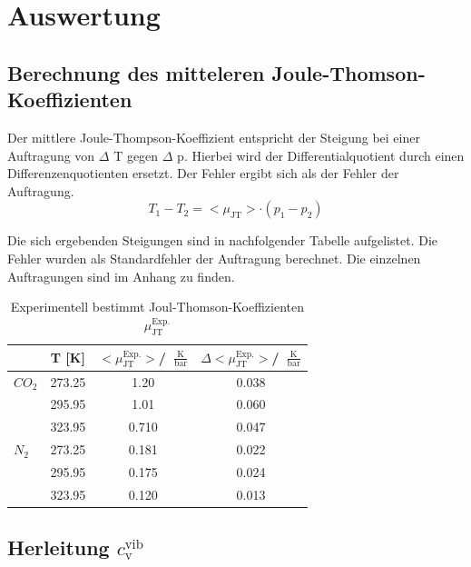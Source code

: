 \documentclass[a4paper,12pt,oneside,onecolum,final,openany]{report}
\begin{document}
\chapter{Auswertung}



\section{Berechnung des mitteleren Joule-Thomson-Koeffizienten}
Der mittlere Joule-Thompson-Koeffizient entspricht der Steigung bei einer Auftragung von $\Delta$ T gegen $\Delta$ p. Hierbei wird der Differentialquotient durch einen Differenzenquotienten ersetzt. Der Fehler ergibt sich als der Fehler der Auftragung.\\

\begin{equation}
T_1 - T_2 = <\mu_{\text{JT}}> \cdot (p_1 - p_2)
\end{equation}

Die sich ergebenden Steigungen sind in nachfolgender Tabelle aufgelistet. Die Fehler wurden als Standardfehler der Auftragung berechnet. Die einzelnen Auftragungen sind im Anhang zu finden.\\

\begin{table} [h]
\centering
\caption{Experimentell bestimmt Joul-Thomson-Koeffizienten $\mu_{\text{JT}}^{\text{Exp.}}$}
\begin{tabular} {l | c|  c | c}
	 &  T [K] & $<\mu_{\text{JT}}^{\text{Exp.}}>$/~$\frac{\mathrm{K}}{\mathrm{bar}}$ & $\Delta <\mu_{\text{JT}}^{\text{Exp.}}>$/~$\frac{\mathrm{K}}{\mathrm{bar}}$\\
	 \hline
	  $CO_\mathrm{2}$ & 273.25 & 1.20 & 0.038 \\
	   & 295.95 & 1.01 & 0.060\\
	  & 323.95 & 0.710 & 0.047\\
	\hline
	$N_\mathrm{2}$ & 273.25 & 0.181  &  0.022\\
	& 295.95 & 0.175 & 0.024\\
	& 323.95& 0.120& 0.013\\
\end{tabular}
\end{table}
\section{Herleitung $c_\mathrm{v}^\mathrm{ vib}$}
\end{document}
